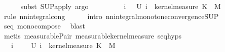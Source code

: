 \begin{isabellebody}
\ \ \ \ \isamarkupfalse%
\ {\isacharparenleft}{\kern0pt}subst\ SUP{\isacharunderscore}{\kern0pt}apply{\isacharcomma}{\kern0pt}\ argo{\isacharparenright}{\kern0pt}\isanewline
\ \ \isamarkupfalse%
\ \isamarkupfalse%
\ {\isachardoublequoteopen}{\isachardot}{\kern0pt}{\isachardot}{\kern0pt}{\isachardot}{\kern0pt}\ {\isacharequal}{\kern0pt}\ {\isasymintegral}\isactrlsup {\isacharplus}{\kern0pt}\ {\isasymomega}\ {\isacharparenleft}{\kern0pt}{\isasymSqunion}i{\isachardot}{\kern0pt}\ {\isasymintegral}\isactrlsup {\isacharplus}{\kern0pt}\ {\isasymomega}\ U\ i\ {\isacharparenleft}{\kern0pt}{\isasymomega}\ {\isasymomega}kernel{\isacharunderscore}{\kern0pt}measure\ K\ {\isasymomega}\ {\isasympartial}M{\isachardoublequoteclose}\isanewline
\ \ \ \ \isamarkupfalse%
\ {\isacharparenleft}{\kern0pt}rule\ nn{\isacharunderscore}{\kern0pt}integral{\isacharunderscore}{\kern0pt}cong{\isacharparenright}{\kern0pt}\isanewline
\ \ \ \ \isamarkupfalse%
\ {\isacharparenleft}{\kern0pt}intro\ nn{\isacharunderscore}{\kern0pt}integral{\isacharunderscore}{\kern0pt}monotone{\isacharunderscore}{\kern0pt}convergence{\isacharunderscore}{\kern0pt}SUP{\isacharparenright}{\kern0pt}\isanewline
\ \ \ \ \isamarkupfalse%
\ seq{\isacharparenleft}{\kern0pt}{}{\isacharparenright}{\kern0pt}\ mono{\isacharunderscore}{\kern0pt}compose\ \isamarkupfalse%
\ blast\isanewline
\ \ \ \ \isamarkupfalse%
\ {\isacharparenleft}{\kern0pt}metis\ measurable{\isacharunderscore}{\kern0pt}Pair{}\ measurable{\isacharunderscore}{\kern0pt}kernel{\isacharunderscore}{\kern0pt}measure\ seq{\isachardot}{\kern0pt}hyps{\isacharparenleft}{\kern0pt}{}{\isacharparenright}{\kern0pt}{\isacharparenright}{\kern0pt}\isanewline
\ \ \ \ \isamarkupfalse%
\isanewline
\ \ \isamarkupfalse%
\ \isamarkupfalse%
\ {\isachardoublequoteopen}{\isachardot}{\kern0pt}{\isachardot}{\kern0pt}{\isachardot}{\kern0pt}\ {\isacharequal}{\kern0pt}\ {\isacharparenleft}{\kern0pt}{\isasymSqunion}i{\isachardot}{\kern0pt}\ {\isasymintegral}\isactrlsup {\isacharplus}{\kern0pt}\ {\isasymomega}\ {\isasymintegral}\isactrlsup {\isacharplus}{\kern0pt}\ {\isasymomega}\ U\ i\ {\isacharparenleft}{\kern0pt}{\isasymomega}\ {\isasymomega}kernel{\isacharunderscore}{\kern0pt}measure\ K\ {\isasymomega}\ {\isasympartial}M{\isacharparenright}{\kern0pt}{\isachardoublequoteclose}\isanewline

\end{isabellebody}
